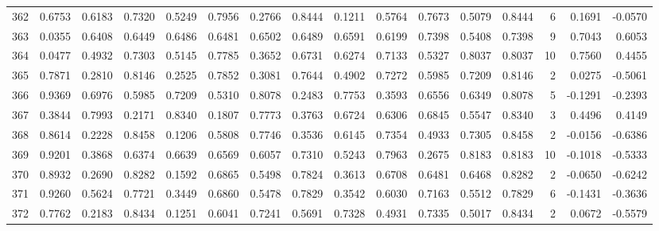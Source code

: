 \begin{tabular}{lrrrrrrrrrrrrrrr}
362 &      0.6753 &  0.6183 &  0.7320 &  0.5249 &  0.7956 &  0.2766 &  0.8444 &  0.1211 &  0.5764 &  0.7673 &   0.5079 &     0.8444 &      6 &                    0.1691 &                    -0.0570 \\
363 &      0.0355 &  0.6408 &  0.6449 &  0.6486 &  0.6481 &  0.6502 &  0.6489 &  0.6591 &  0.6199 &  0.7398 &   0.5408 &     0.7398 &      9 &                    0.7043 &                     0.6053 \\
364 &      0.0477 &  0.4932 &  0.7303 &  0.5145 &  0.7785 &  0.3652 &  0.6731 &  0.6274 &  0.7133 &  0.5327 &   0.8037 &     0.8037 &     10 &                    0.7560 &                     0.4455 \\
365 &      0.7871 &  0.2810 &  0.8146 &  0.2525 &  0.7852 &  0.3081 &  0.7644 &  0.4902 &  0.7272 &  0.5985 &   0.7209 &     0.8146 &      2 &                    0.0275 &                    -0.5061 \\
366 &      0.9369 &  0.6976 &  0.5985 &  0.7209 &  0.5310 &  0.8078 &  0.2483 &  0.7753 &  0.3593 &  0.6556 &   0.6349 &     0.8078 &      5 &                   -0.1291 &                    -0.2393 \\
367 &      0.3844 &  0.7993 &  0.2171 &  0.8340 &  0.1807 &  0.7773 &  0.3763 &  0.6724 &  0.6306 &  0.6845 &   0.5547 &     0.8340 &      3 &                    0.4496 &                     0.4149 \\
368 &      0.8614 &  0.2228 &  0.8458 &  0.1206 &  0.5808 &  0.7746 &  0.3536 &  0.6145 &  0.7354 &  0.4933 &   0.7305 &     0.8458 &      2 &                   -0.0156 &                    -0.6386 \\
369 &      0.9201 &  0.3868 &  0.6374 &  0.6639 &  0.6569 &  0.6057 &  0.7310 &  0.5243 &  0.7963 &  0.2675 &   0.8183 &     0.8183 &     10 &                   -0.1018 &                    -0.5333 \\
370 &      0.8932 &  0.2690 &  0.8282 &  0.1592 &  0.6865 &  0.5498 &  0.7824 &  0.3613 &  0.6708 &  0.6481 &   0.6468 &     0.8282 &      2 &                   -0.0650 &                    -0.6242 \\
371 &      0.9260 &  0.5624 &  0.7721 &  0.3449 &  0.6860 &  0.5478 &  0.7829 &  0.3542 &  0.6030 &  0.7163 &   0.5512 &     0.7829 &      6 &                   -0.1431 &                    -0.3636 \\
372 &      0.7762 &  0.2183 &  0.8434 &  0.1251 &  0.6041 &  0.7241 &  0.5691 &  0.7328 &  0.4931 &  0.7335 &   0.5017 &     0.8434 &      2 &                    0.0672 &                    -0.5579 \\

\end{tabular}
